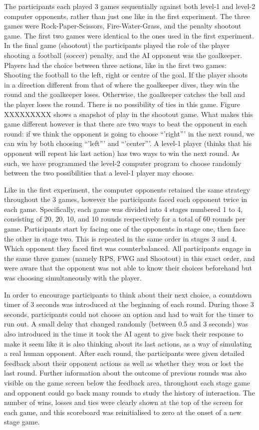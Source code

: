 \documentclass[man,floatsintext]{apa6}
\begin{document}
The participants each played 3 games sequentially against both level-1 and level-2 computer opponents, rather than just one like in the first experiment. The three games were Rock-Paper-Scissors, Fire-Water-Grass, and the penalty shootout game. The first two games were identical to the ones used in the first experiment. In the final game (shootout) the participants played the role of the player shooting a football (soccer) penalty, and the AI opponent was the goalkeeper. Players had the choice between three actions, like in the first two games: Shooting the football to the left, right or centre of the goal. If the player shoots in a direction different from that of where the goalkeeper dives, they win the round and the goalkeeper loses. Otherwise, the goalkeeper catches the ball and the player loses the round. There is no possibility of ties in this game. Figure XXXXXXXXX shows a snapshot of play in the shootout game. What makes this game different however is that there are two ways to beat the opponent in each round: if we think the opponent is going to choose \enquote{'right}' in the next round, we can win by both choosing \enquote{'left}' and \enquote{'center}'. A level-1 player (thinks that his opponent will repeat his last action) has two ways to win the next round. As such, we have programmed the level-2 computer program to choose randomly between the two possibilities that a level-1 player may choose.

Like in the first experiment, the computer opponents retained the same strategy throughout the 3 games, however the participants faced each opponent twice in each game. Specifically, each game was divided into 4 stages numbered 1 to 4, consisting of 20, 20, 10, and 10 rounds respectively for a total of 60 rounds per game. Participants start by facing one of the opponents in stage one, then face the other in stage two. This is repeated in the same order in stages 3 and 4. Which opponent they faced first was counterbalanced. All participants engage in the same three games (namely RPS, FWG and Shootout) in this exact order, and were aware that the opponent was not able to know their choices beforehand but was choosing simultaneously with the player.

In order to encourage participants to think about their next choice, a countdown timer of 3 seconds was introduced at the beginning of each round. During those 3 seconds, participants could not choose an option and had to wait for the timer to run out. A small delay that changed randomly (between 0.5 and 3 seconds) was also introduced in the time it took the AI agent to give back their response to make it seem like it is also thinking about its last actions, as a way of simulating a real human opponent. After each round, the participants were given detailed feedback about their opponent actions as well as whether they won or lost the last round. Further information about the outcome of previous rounds was also visible on the game screen below the feedback area, throughout each stage game and opponent could go back many rounds to study the history of interaction. The number of wins, losses and ties were clearly shown at the top of the screen for each game, and this scoreboard was reinitialised to zero at the onset of a new stage game.
\end{document}
